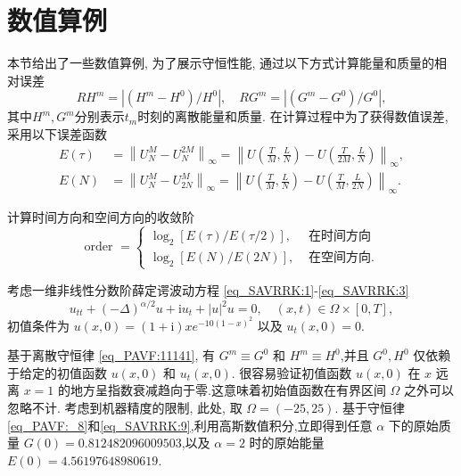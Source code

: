 \section{数值算例}\label{Section_PAVF: 4}

本节给出了一些数值算例, 为了展示守恒性能, 通过以下方式计算能量和质量的相对误差
\begin{equation}\label{eq_PAVF:105}
R H^{m}=\left|\left(H^{m}-H^{0}\right) / H^{0}\right|, \quad R G^{m}=\left|\left(G^{m}-G^{0}\right) / G^{0}\right|,
\end{equation}
其中$H^{m}, G^{m}$分别表示$t_{m}$时刻的离散能量和质量.
在计算过程中为了获得数值误差,采用以下误差函数
\begin{align}\label{eq_PAVF:103}
E(\tau)&=\left\|U_{N}^{M}-U_{N}^{2 M}\right\|_{\infty}=\left\|U\left(\frac{T}{M}, \frac{L}{N}\right)-U\left(\frac{T}{2 M}, \frac{L}{N}\right)\right\|_{\infty},\nonumber\\
E(N)&=\left\|U_{N}^{M}-U_{2 N}^{M}\right\|_{\infty}=\left\|U\left(\frac{T}{M}, \frac{L}{N}\right)-U\left(\frac{T}{M}, \frac{L}{2 N}\right)\right\|_{\infty}.
\end{align}

计算时间方向和空间方向的收敛阶
\begin{equation}
\text { order }= \left\{
\begin{aligned}
\log _{2}[E(\tau) / E(\tau / 2)], & \text { 在时间方向 } \\
\log _{2}[E(N) / E(2 N)], & \text { 在空间方向. }
\end{aligned}\right.\label{eq_PAVF:104}
\end{equation}
\begin{example}\label{exp_PAVF:2}
	考虑一维非线性分数阶薛定谔波动方程 \eqref{eq_SAVRRK:1}-\eqref{eq_SAVRRK:3}
	\begin{equation}\label{eq_PAVF:108}
	u_{t t}+(-\Delta)^{\alpha / 2} u+\mathrm{i}u_t+|u|^2 u=0, \quad (x,t)\in  \Omega\times[0, T],
	\end{equation}
	初值条件为 $u(x, 0)=(1+\mathrm{i}) x e^{-10(1-x)^2}$ 以及 $u_t(x, 0)=0$.
\end{example}

	基于离散守恒律 \eqref{eq_PAVF:11141}, 有 $G^{m}\equiv G^0$ 和 $H^{m}\equiv H^0$,并且 $G^0, H^0$ 仅依赖于给定的初值函数 $u(x,0)$ 和 $u_t(x, 0)$.
	很容易验证初值函数 $u(x, 0)$ 在 $x$ 远离 $x=1$ 的地方呈指数衰减趋向于零.这意味着初始值函数在有界区间 $\Omega$ 之外可以忽略不计. 
	考虑到机器精度的限制, 此处, 取 $\Omega=(-25,25)$.
	基于守恒律 \eqref{eq_PAVF:_8}和\eqref{eq_SAVRRK:9},利用高斯数值积分,立即得到任意 $\alpha$ 下的原始质量 $G(0)=0.812482096009503$,以及 $\alpha=2$ 时的原始能量 $E(0)=4.56197648980619$.

